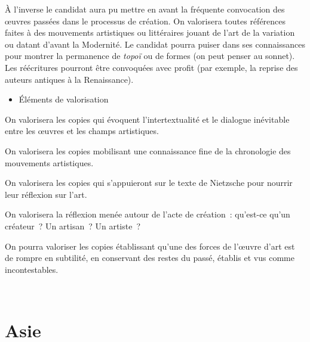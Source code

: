 {À l'inverse le candidat aura pu mettre en avant la fréquente convocation des œuvres
passées dans le processus de création. On valorisera toutes références faites à des
mouvements artistiques ou littéraires jouant de l'art de la variation ou datant d'avant la
Modernité. Le candidat pourra puiser dans ses connaissances pour montrer la
permanence de \emph{topoï} ou de formes (on peut penser au sonnet). Les réécritures
pourront être convoquées avec profit (par exemple, la reprise des auteurs antiques à
la Renaissance).

\begin{itemize}[label=\textbullet]
\item Éléments de valorisation
\end{itemize}

On valorisera les copies qui évoquent l'intertextualité et le dialogue inévitable entre les
œuvres et les champs artistiques.

On valorisera les copies mobilisant une connaissance fine de la chronologie des
mouvements artistiques.

On valorisera les copies qui s'appuieront sur le texte de Nietzsche pour nourrir leur
réflexion sur l'art.

On valorisera la réflexion menée autour de l'acte de création~: qu'est-ce qu'un
créateur~? Un artisan~? Un artiste~?

On pourra valoriser les copies établissant qu'une des forces de l'œuvre d'art est de
rompre en subtilité, en conservant des restes du passé, établis et vus comme
incontestables.}

\vfill{~}\clearpage

\section{Asie}

